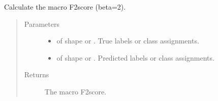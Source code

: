 \documentclass[letterpaper,10pt,english]{sphinxmanual}
\begin{document}
\begin{fulllineitems}
\label{\detokenize{pusion.evaluation.evaluation_metrics:pusion.evaluation.evaluation_metrics.macro_f2}}
\sphinxAtStartPar
Calculate the macro F2\sphinxhyphen{}score (beta=2).
\begin{quote}\begin{description}
\item[{Parameters}] \leavevmode\begin{itemize}
\item {} 
\sphinxAtStartPar
{} \textendash{}  of shape  or . True labels or class assignments.

\item {} 
\sphinxAtStartPar
{} \textendash{}  of shape  or . Predicted labels or
class assignments.

\end{itemize}

\item[{Returns}] \leavevmode
\sphinxAtStartPar
The macro F2\sphinxhyphen{}score.

\end{description}\end{quote}

\end{fulllineitems}

\end{document}
